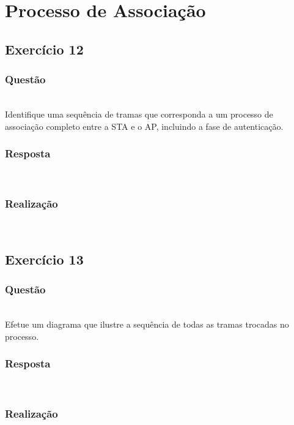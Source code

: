 \documentclass{llncs}
\begin{document}
\clearpage

\section{Processo de Associação}
\subsection{Exercício 12}
\subsubsection{Questão}\rule[-10pt]{0pt}{10pt}\\

Identifique uma sequência de tramas que corresponda a um processo de associação completo entre a STA e o AP, incluindo a fase de autenticação.

\subsubsection{Resposta}\rule[-10pt]{0pt}{10pt}\\



\subsubsection{Realização}\rule[-10pt]{0pt}{10pt}\\



\clearpage
\subsection{Exercício 13}
\subsubsection{Questão}\rule[-10pt]{0pt}{10pt}\\

Efetue um diagrama que ilustre a sequência de todas as tramas trocadas no processo.

\subsubsection{Resposta}\rule[-10pt]{0pt}{10pt}\\



\subsubsection{Realização}\rule[-10pt]{0pt}{10pt}\\
\end{document}
